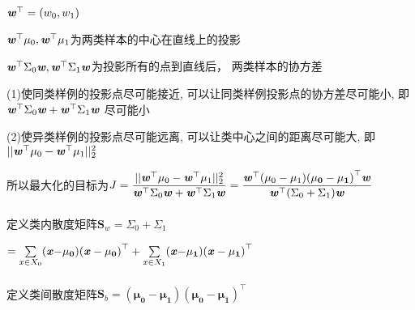\documentclass[UTF8]{ctexart}
\begin{document}
$\mathbf{\textbf{\emph{w}}}^\top =(w_0,w_1)$







$\mathbf{\textbf {\emph{w}}}^\top \mu _0
    ,\mathbf{\textbf {\emph{w}}}^\top \mu _1$为两类样本的中心在直线上的投影

$\mathbf{\textbf {\emph{w}}}^\top \Sigma _0 \textbf{\emph{w}}
    ,\mathbf{\textbf {\emph{w}}}^\top \Sigma _1 \textbf{\emph{w}}$为投影所有的点到直线后，
两类样本的协方差

(1)使同类样例的投影点尽可能接近, 可以让同类样例投影点的协方差尽可能小,
即$\mathbf{\textbf {\emph{w}}}^\top \Sigma _0 \textbf{\emph{w}}
    +\mathbf{\textbf {\emph{w}}}^\top \Sigma _1 \textbf{\emph{w}} $
尽可能小

(2)使异类样例的投影点尽可能远离, 可以让类中心之间的距离尽可能大,
即$|| \mathbf{\textbf {\emph{w}}}^\top \mu _0-\mathbf{\textbf {\emph{w}}}^\top \mu _1||_2^2$

所以最大化的目标为$\displaystyle{J=\frac{|| \mathbf{\textbf {\emph{w}}}^\top \mu _0-\mathbf{\textbf {\emph{w}}}^\top \mu _1||_2^2}
        {\mathbf{\textbf {\emph{w}}}^\top \Sigma _0 \textbf{\emph{w}}
            +\mathbf{\textbf {\emph{w}}}^\top \Sigma _1 \textbf{\emph{w}} }
        =\frac{\mathbf{\textbf {\emph{w}}}^\top (\mu_0-\mu_1 )\mathbf{(\mu_0-\mu_1 )}^\top \textbf{\emph{w}}}
        {\mathbf{\textbf {\emph{w}}}^\top (\Sigma _0+\Sigma _1 )\textbf{\emph{w}} }
    }$
\\
\\
定义类内散度矩阵$\textbf{S}_w=\Sigma _0+\Sigma _1$

$
    =\sum\limits_{x\in X_{0}} (\textbf{\emph{x}} \mathbf {-\mu_0 )(\textbf{\emph{x}} -\mu_0)}^\top+
    \sum\limits_{x\in X_{1}}(\textbf{\emph{x}}  \mathbf {-\mu_1 )(\textbf{\emph{x}} -\mu_1)}^\top
$
\\
\\
定义类间散度矩阵$ \textbf{S}_b=\mathbf{(\mu_0-\mu_1 )(\mu_0-\mu_1 )}^\top$
\end{document}
